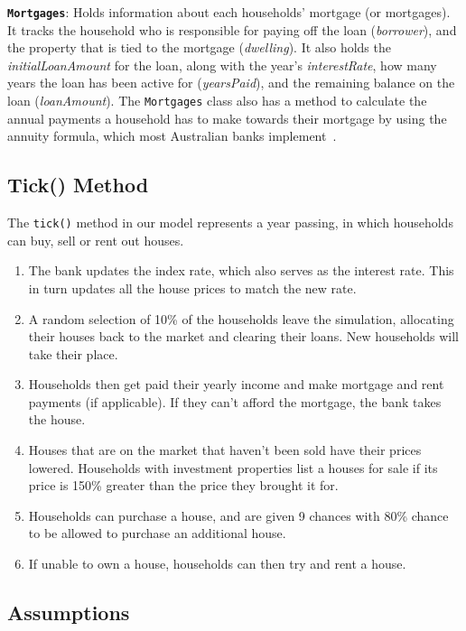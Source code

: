 \documentclass[11pt]{article}
\begin{document}
\noindent\texttt\textbf{{Mortgages}}: Holds information about each households' mortgage 
(or mortgages). It tracks the household who is responsible for paying off the loan
(\textit{borrower}), and the property that is tied to the mortgage (\textit{dwelling}).
It also holds the \textit{initialLoanAmount} for the loan, along with the year's 
\textit{interestRate}, how many years the loan has been active for (\textit{yearsPaid}),
and the remaining balance on the loan (\textit{loanAmount}). The \texttt{Mortgages}
class also has a method to calculate the annual payments a household has to make
towards their mortgage by using the annuity formula, which most Australian banks 
implement~\cite{wikimortgage}\cite{moneysmart}.

\subsection{Tick() Method}
The \texttt{tick()} method in our model represents a year passing, in which households
can buy, sell or rent out houses.
\begin{enumerate}
    \item The bank updates the index rate, which also serves as the interest rate. 
    This in turn updates all the house prices to match the new rate.
    \item A random selection of 10\% of the households leave the simulation, allocating
    their houses back to the market and clearing their loans. New households will take
    their place.
    \item Households then get paid their yearly income and make mortgage and rent
    payments (if applicable). If they can't afford the mortgage, the bank takes the house.
    \item Houses that are on the market that haven't been sold have their prices lowered.
    Households with investment properties list a houses for sale if its
    price is 150\% greater than the price they brought it for. 
    \item Households can purchase a house, and are given 9 chances with 80\% chance to be allowed to purchase an additional house.
    \item If unable to own a house, households can then try and rent a house.
\end{enumerate}

\subsection{Assumptions}
\end{document}
